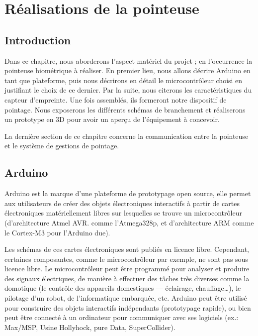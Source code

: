 \chapter{Réalisations de la pointeuse}
\renewcommand{\headrulewidth}{1pt}

\section{Introduction}
Dans ce chapitre, nous aborderons l’aspect matériel du projet ; en l’occurrence 
la pointeuse biométrique à réaliser. En premier lieu, nous allons décrire 
Arduino en tant que plateforme, puis nous décrirons en détail le microcontrôleur 
choisi en justifiant le choix de ce dernier. Par la suite, nous citerons les 
caractéristiques du capteur d’empreinte. Une fois assemblés, ils formeront notre 
dispositif de pointage. Nous exposerons les différents schémas de branchement et 
réaliserons un prototype en 3D pour avoir un aperçu de l’équipement à concevoir. 

La dernière section de ce chapitre concerne la communication entre la pointeuse 
et le système de gestions de pointage.

\section{Arduino}
Arduino est la marque d’une plateforme de prototypage open source, elle permet 
aux utilisateurs de créer des objets électroniques interactifs à partir de 
cartes électroniques matériellement libres sur lesquelles se trouve un 
microcontrôleur (d’architecture Atmel AVR. comme l’Atmega328p, et d’architecture 
ARM comme le Cortex-M3 pour l’Arduino due).

Les schémas de ces cartes électroniques sont publiés en licence libre. 
Cependant, certaines composantes, comme le microcontrôleur par exemple, ne 
sont pas sous licence libre. Le microcontrôleur peut être programmé pour 
analyser et produire des signaux électriques, de manière à effectuer des 
tâches très diverses comme la domotique (le contrôle des appareils 
domestiques — éclairage, chauffage…), le pilotage d’un robot, de l’informatique 
embarquée, etc. Arduino peut être utilisé pour construire des objets 
interactifs indépendants (prototypage rapide), ou bien peut être connecté à un 
ordinateur pour communiquer avec ses logiciels (ex.: Max/MSP, Usine Hollyhock, 
pure Data, SuperCollider).

